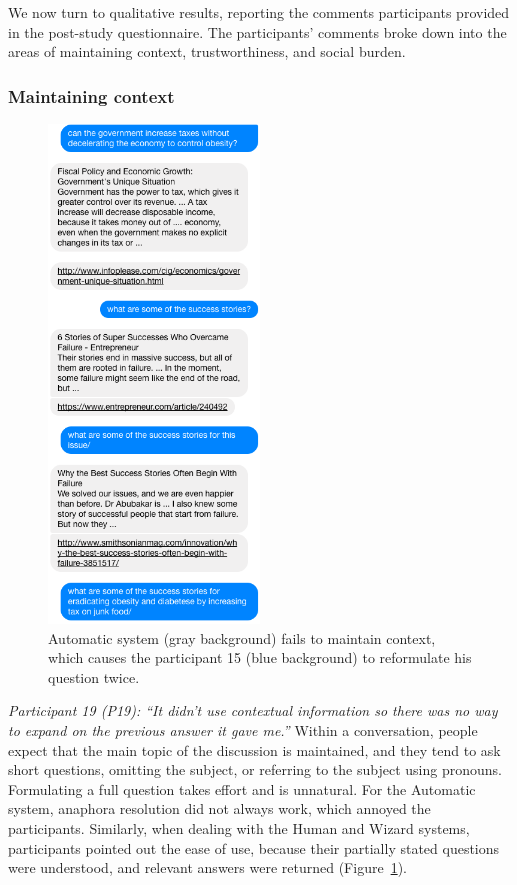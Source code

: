 We now turn to qualitative results, reporting the comments participants provided in the post-study questionnaire. The participants' comments broke down into the areas of maintaining context, trustworthiness, and social burden.

\subsubsection{Maintaining context}

\begin{figure}
    \centering
    \includegraphics[width=0.5\textwidth]{img/conversation_userstudy_context}
    \caption{Automatic system (gray background) fails to maintain context, which causes the participant 15 (blue background) to reformulate his question twice.}
    \label{figure:conversation:user-study:context}
\end{figure}

\textit{Participant 19 (P19): ``It didn't use contextual information so there was no way to expand on the previous answer it gave me.''} Within a conversation, people expect that the main topic of the discussion is maintained, and they tend to ask short questions, omitting the subject, or referring to the subject using pronouns. Formulating a full question takes effort and is unnatural. For the Automatic system, anaphora resolution did not always work, which annoyed the participants. Similarly, when dealing with the Human and Wizard systems, participants pointed out the ease of use, because their partially stated questions were understood, and relevant answers were returned (Figure~\ref{figure:conversation:user-study:context}).

